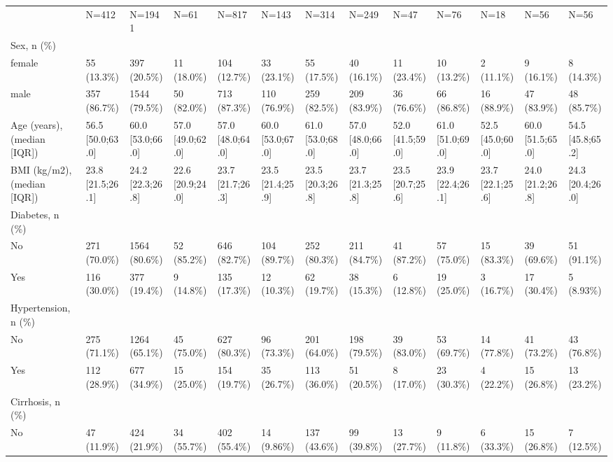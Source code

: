 \begin{landscape}
\begin{center}
\begin{longtable}{p{5.2cm}p{3.0cm}}
     & N=412 & N=1941 & N=61 & N=817 & N=143 & N=314 & N=249 & N=47 & N=76 & N=18 & N=56 & N=56 \\
Sex, n (\%) &  &  &  &  &  &  &  &  &  &  &  &  \\
female & 55 (13.3\%) & 397 (20.5\%) & 11 (18.0\%) & 104 (12.7\%) & 33 (23.1\%) & 55 (17.5\%) & 40 (16.1\%) & 11 (23.4\%) & 10 (13.2\%) & 2 (11.1\%) & 9 (16.1\%) & 8 (14.3\%) \\
male & 357 (86.7\%) & 1544 (79.5\%) & 50 (82.0\%) & 713 (87.3\%) & 110 (76.9\%) & 259 (82.5\%) & 209 (83.9\%) & 36 (76.6\%) & 66 (86.8\%) & 16 (88.9\%) & 47 (83.9\%) & 48 (85.7\%) \\
Age (years), (median [IQR]) & 56.5 [50.0;63.0] & 60.0 [53.0;66.0] & 57.0 [49.0;62.0] & 57.0 [48.0;64.0] & 60.0 [53.0;67.0] & 61.0 [53.0;68.0] & 57.0 [48.0;66.0] & 52.0 [41.5;59.0] & 61.0 [51.0;69.0] & 52.5 [45.0;60.0] & 60.0 [51.5;65.0] & 54.5 [45.8;65.2] \\
BMI (kg/m2), (median [IQR]) & 23.8 [21.5;26.1] & 24.2 [22.3;26.8] & 22.6 [20.9;24.0] & 23.7 [21.7;26.3] & 23.5 [21.4;25.9] & 23.5 [20.3;26.8] & 23.7 [21.3;25.8] & 23.5 [20.7;25.6] & 23.9 [22.4;26.1] & 23.7 [22.1;25.6] & 24.0 [21.2;26.8] & 24.3 [20.4;26.0] \\
Diabetes, n (\%) &  &  &  &  &  &  &  &  &  &  &  &  \\
No & 271 (70.0\%) & 1564 (80.6\%) & 52 (85.2\%) & 646 (82.7\%) & 104 (89.7\%) & 252 (80.3\%) & 211 (84.7\%) & 41 (87.2\%) & 57 (75.0\%) & 15 (83.3\%) & 39 (69.6\%) & 51 (91.1\%) \\
Yes & 116 (30.0\%) & 377 (19.4\%) & 9 (14.8\%) & 135 (17.3\%) & 12 (10.3\%) & 62 (19.7\%) & 38 (15.3\%) & 6 (12.8\%) & 19 (25.0\%) & 3 (16.7\%) & 17 (30.4\%) & 5 (8.93\%) \\
Hypertension, n (\%) &  &  &  &  &  &  &  &  &  &  &  &  \\
No & 275 (71.1\%) & 1264 (65.1\%) & 45 (75.0\%) & 627 (80.3\%) & 96 (73.3\%) & 201 (64.0\%) & 198 (79.5\%) & 39 (83.0\%) & 53 (69.7\%) & 14 (77.8\%) & 41 (73.2\%) & 43 (76.8\%) \\
Yes & 112 (28.9\%) & 677 (34.9\%) & 15 (25.0\%) & 154 (19.7\%) & 35 (26.7\%) & 113 (36.0\%) & 51 (20.5\%) & 8 (17.0\%) & 23 (30.3\%) & 4 (22.2\%) & 15 (26.8\%) & 13 (23.2\%) \\
Cirrhosis, n (\%) &  &  &  &  &  &  &  &  &  &  &  &  \\
No & 47 (11.9\%) & 424 (21.9\%) & 34 (55.7\%) & 402 (55.4\%) & 14 (9.86\%) & 137 (43.6\%) & 99 (39.8\%) & 13 (27.7\%) & 9 (11.8\%) & 6 (33.3\%) & 15 (26.8\%) & 7 (12.5\%) \\

\end{longtable}
\end{center}
\end{landscape}
